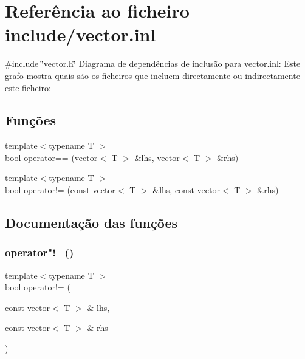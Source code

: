 \hypertarget{vector_8inl}{}\section{Referência ao ficheiro include/vector.inl}
\label{vector_8inl}
{\ttfamily \#include \char`\"{}vector.\+h\char`\"{}}\newline
Diagrama de dependências de inclusão para vector.\+inl\+:
Este grafo mostra quais são os ficheiros que incluem directamente ou indirectamente este ficheiro\+:
\subsection*{Funções}
\begin{DoxyCompactItemize}
\item 
{\footnotesize template$<$typename T $>$ }\\bool \hyperlink{vector_8inl_a7c456a6a390a779890d09b7eb9fc9f47}{operator==} (\hyperlink{classsc_1_1vector}{vector}$<$ T $>$ \&lhs, \hyperlink{classsc_1_1vector}{vector}$<$ T $>$ \&rhs)
\item 
{\footnotesize template$<$typename T $>$ }\\bool \hyperlink{vector_8inl_aec5c54cbcb8ee83a1b0552d4a7a7a016}{operator!=} (const \hyperlink{classsc_1_1vector}{vector}$<$ T $>$ \&lhs, const \hyperlink{classsc_1_1vector}{vector}$<$ T $>$ \&rhs)
\end{DoxyCompactItemize}


\subsection{Documentação das funções}
\mbox{\label{vector_8inl_aec5c54cbcb8ee83a1b0552d4a7a7a016}} 
\subsubsection{\texorpdfstring{operator"!=()}{operator!=()}}
{\footnotesize\ttfamily template$<$typename T $>$ \\
bool operator!= (\begin{DoxyParamCaption}\item[{const \hyperlink{classsc_1_1vector}{vector}$<$ T $>$ \&}]{lhs,  }\item[{const \hyperlink{classsc_1_1vector}{vector}$<$ T $>$ \&}]{rhs }\end{DoxyParamCaption})}

